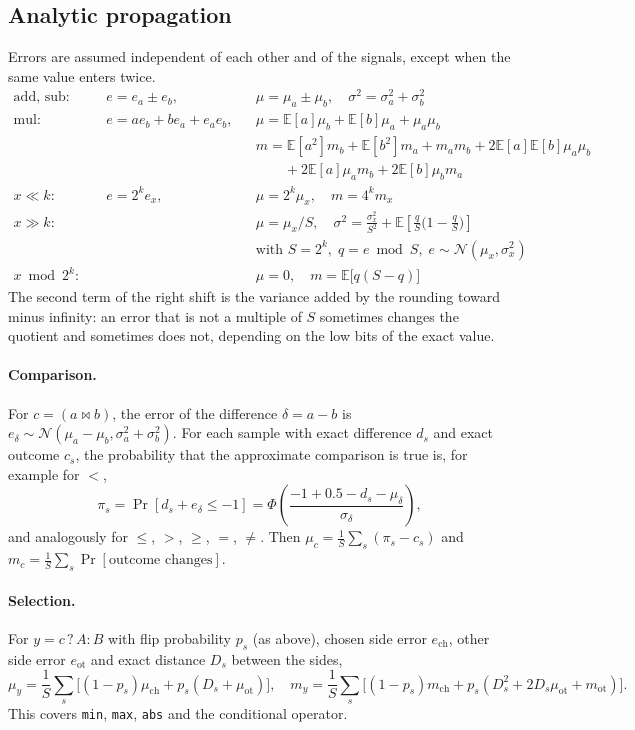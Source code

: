 \documentclass[11pt,a4paper]{article}
\newcommand{\E}{\mathbb{E}}
\begin{document}
\subsection{Analytic propagation}

Errors are assumed independent of each other and of the signals, except when the same value enters twice.
\begin{align*}
  \text{add, sub:}\quad & e = e_a \pm e_b, &&
    \mu = \mu_a \pm \mu_b,\quad \sigma^2 = \sigma_a^2 + \sigma_b^2 \\
  \text{mul:}\quad & e = a e_b + b e_a + e_a e_b, &&
    \mu = \E[a]\mu_b + \E[b]\mu_a + \mu_a\mu_b \\
  & && m = \E[a^2] m_b + \E[b^2] m_a + m_a m_b + 2\E[a]\E[b]\mu_a\mu_b \\
  & && \qquad + 2\E[a]\mu_a m_b + 2\E[b]\mu_b m_a \\
  x \ll k:\quad & e = 2^k e_x, && \mu = 2^k \mu_x,\quad m = 4^k m_x \\
  x \gg k:\quad & && \mu = \mu_x / S,\quad
     \sigma^2 = \frac{\sigma_x^2}{S^2} + \E\!\left[ \frac{q}{S}\Big(1 - \frac{q}{S}\Big) \right] \\
  & && \text{with } S = 2^k,\; q = e \bmod S,\; e \sim \mathcal{N}(\mu_x, \sigma_x^2) \\
  x \bmod 2^k:\quad & && \mu = 0,\quad m = \E\big[ q (S - q) \big]
\end{align*}
The second term of the right shift is the variance added by the rounding toward minus infinity: an error that is not
a multiple of $S$ sometimes changes the quotient and sometimes does not, depending on the low bits of the exact value.

\paragraph{Comparison.} For $c = (a \bowtie b)$, the error of the difference $\delta = a - b$ is
$e_\delta \sim \mathcal{N}(\mu_a - \mu_b, \sigma_a^2 + \sigma_b^2)$. For each sample with exact difference $d_s$ and exact
outcome $c_s$, the probability that the approximate comparison is true is, for example for $<$,
\[
  \pi_s = \Pr[d_s + e_\delta \le -1] = \Phi\!\left( \frac{-1 + 0.5 - d_s - \mu_\delta}{\sigma_\delta} \right),
\]
and analogously for $\le$, $>$, $\ge$, $=$, $\ne$. Then
$\mu_c = \frac{1}{S}\sum_s (\pi_s - c_s)$ and $m_c = \frac{1}{S}\sum_s \Pr[\text{outcome changes}]$.

\paragraph{Selection.} For $y = c\,?\,A : B$ with flip probability $p_s$ (as above), chosen side error $e_{\text{ch}}$,
other side error $e_{\text{ot}}$ and exact distance $D_s$ between the sides,
\[
  \mu_y = \frac{1}{S}\sum_s \Big[ (1 - p_s)\mu_{\text{ch}} + p_s (D_s + \mu_{\text{ot}}) \Big], \quad
  m_y = \frac{1}{S}\sum_s \Big[ (1 - p_s) m_{\text{ch}} + p_s (D_s^2 + 2 D_s \mu_{\text{ot}} + m_{\text{ot}}) \Big].
\]
This covers \texttt{min}, \texttt{max}, \texttt{abs} and the conditional operator.
\end{document}
